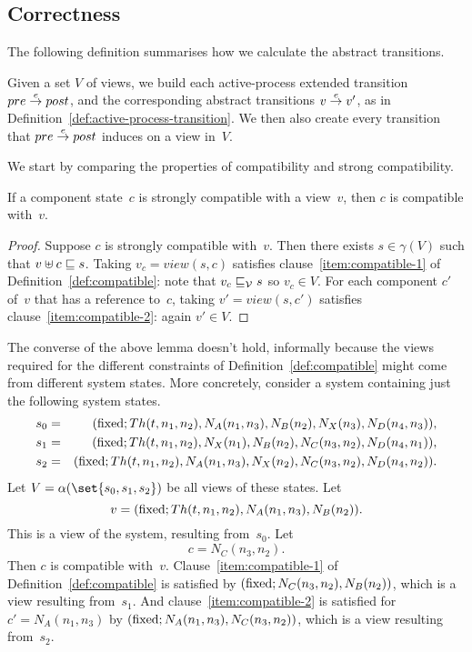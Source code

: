 




\subsection{Correctness}
\label{sec:views-correctness}


The following definition summarises how we calculate the abstract transitions.

\begin{definition}
Given a set $V$ of views, we build each active-process extended transition
$pre \stackrel{e}\rightarrow post$, and the corresponding abstract transitions $v \stackrel{e}\rightarrow
v'$, as in Definition~\ref{def:active-process-transition}.
%
We then also create every transition that $pre \stackrel{e}\rightarrow post$ induces on a
view in~$V$. 
\end{definition}

We start by comparing the properties of compatibility and strong compatibility.
%
\begin{lemma}
\label{lem:strong-compatible-implies-compatible}
If a component state~$c$ is strongly compatible with a view~$v$, then
$c$ is compatible with~$v$. 
\end{lemma}
%
\begin{proof}
Suppose $c$ is strongly compatible with~$v$.  Then there exists $s \in
\gamma(V)$ such that $v \uplus c \sqsubseteq s$.  Taking $v_c = view(s, c)$
satisfies clause~\ref{item:compatible-1} of Definition~\ref{def:compatible}:
note that $v_c \sqsubseteq_{\mathcal{V}} s$ so $v_c \in V$.  For each component $c'$ of~$v$
that has a reference to~$c$, taking $v' = view(s,c')$ satisfies
clause~\ref{item:compatible-2}: again $v' \in V$.
\end{proof}

The converse of the above lemma doesn't hold, informally because the views
required for the different constraints of Definition~\ref{def:compatible}
might come from different system states.  More concretely, consider a system
containing just the following system states.
%
\begin{eqnarray*}
s_0 & = &
   (\mathrm{fixed}; Th(t,n_1,n_2), N_A(n_1,n_3), N_B(n_2), N_X(n_3), N_D(n_4,n_3)), \\
s_1 & = &
  (\mathrm{fixed}; Th(t,n_1,n_2), N_X(n_1), N_B(n_2), N_C(n_3,n_2), N_D(n_4,n_1)),\\
s_2 & = & 
  (\mathrm{fixed}; Th(t,n_1,n_2), N_A(n_1,n_3), N_X(n_2), N_C(n_3,n_2), N_D(n_4,n_2)).
\end{eqnarray*}
%
Let $V = \alpha(\set{s_0,s_1,s_2})$ be all views of these states.  Let
\[
v = (\mathrm{fixed}; Th(t,n_1,n_2), N_A(n_1, n_3), N_B(n_2)).
\]
This is a view of the system, resulting from~$s_0$.  Let 
\[
c = N_C(n_3,n_2).
\]  
Then  $c$ is compatible with~$v$.
%
Clause~\ref{item:compatible-1} of Definition~\ref{def:compatible} is satisfied
by $(\mathrm{fixed}; N_C(n_3,n_2), N_B(n_2))$, which is a view resulting
from~$s_1$.
%
And clause~\ref{item:compatible-2} is satisfied for $c' = N_A(n_1,n_3)$ by
$(\mathrm{fixed}; N_A(n_1, n_3), N_C(n_3,n_2))$, which is a view resulting
from~$s_2$. 


